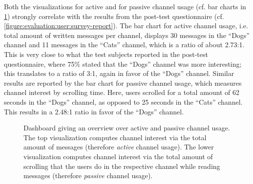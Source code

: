 Both the visualizations for active and for passive channel usage (cf. bar charts in \cref{figure:evaluation:user:dashboard-channels}) strongly correlate with the results from the post-test questionnaire (cf. \cref{figure:evaluation:user:survey-report}).
The bar chart for active channel usage, i.e. total amount of written messages per channel, displays 30 messages in the ``Dogs'' channel and 11 messages in the ``Cats'' channel, which is a ratio of about 2.73:1.
This is very close to what the test subjects reported in the post-test questionnaire, where 75\% stated that the ``Dogs'' channel was more interesting; this translates to a ratio of 3:1, again in favor of the ``Dogs'' channel.
Similar results are reported by the bar chart for passive channel usage, which measures channel interest by scrolling time.
Here, users scrolled for a total amount of 62 seconds in the ``Dogs'' channel, as opposed to 25 seconds in the ``Cats'' channel.
This results in a 2.48:1 ratio in favor of the ``Dogs'' channel.

\begin{figure}[h]
        \caption[Dashboard giving an overview over active and passive channel usage.]{
        Dashboard giving an overview over active and passive channel usage.
        The top visualization computes channel interest via the total amount of messages (therefore \emph{active} channel usage).
        The lower visualization computes channel interest via the total amount of scrolling that the users do in the respective channel while reading messages (therefore \emph{passive} channel usage).
        }
        \label{figure:evaluation:user:dashboard-channels}
\end{figure}

